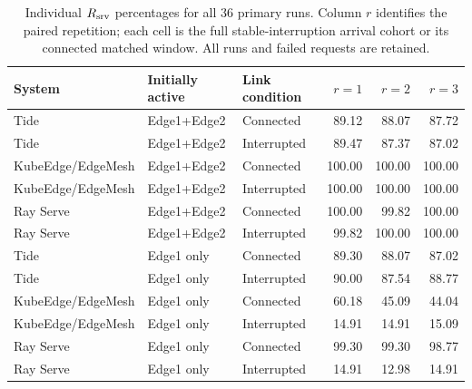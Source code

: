 \begin{table}[htbp]
\centering\small
\caption{Individual $R_{\rm srv}$ percentages for all 36 primary runs. Column $r$ identifies the paired repetition; each cell is the full stable-interruption arrival cohort or its connected matched window. All runs and failed requests are retained.}
\label{tab:domain-individual}
\setlength{\tabcolsep}{5pt}
\begin{tabular}{lllrrr}
\toprule
System & Initially active & Link condition & $r=1$ & $r=2$ & $r=3$\\
\midrule
Tide & Edge1+Edge2 & Connected & 89.12 & 88.07 & 87.72\\
Tide & Edge1+Edge2 & Interrupted & 89.47 & 87.37 & 87.02\\
KubeEdge/EdgeMesh & Edge1+Edge2 & Connected & 100.00 & 100.00 & 100.00\\
KubeEdge/EdgeMesh & Edge1+Edge2 & Interrupted & 100.00 & 100.00 & 100.00\\
Ray Serve & Edge1+Edge2 & Connected & 100.00 & 99.82 & 100.00\\
Ray Serve & Edge1+Edge2 & Interrupted & 99.82 & 100.00 & 100.00\\
Tide & Edge1 only & Connected & 89.30 & 88.07 & 87.02\\
Tide & Edge1 only & Interrupted & 90.00 & 87.54 & 88.77\\
KubeEdge/EdgeMesh & Edge1 only & Connected & 60.18 & 45.09 & 44.04\\
KubeEdge/EdgeMesh & Edge1 only & Interrupted & 14.91 & 14.91 & 15.09\\
Ray Serve & Edge1 only & Connected & 99.30 & 99.30 & 98.77\\
Ray Serve & Edge1 only & Interrupted & 14.91 & 12.98 & 14.91\\
\bottomrule
\end{tabular}
\end{table}

